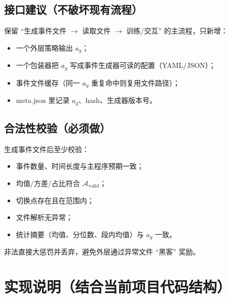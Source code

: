\documentclass[UTF8,11pt,a4paper]{ctexart}
\begin{document}
\subsection{接口建议（不破坏现有流程）}
保留 ``生成事件文件 $\to$ 读取文件 $\to$ 训练/交互'' 的主流程，只新增：
\begin{itemize}
\item 一个外层策略输出 $a_g$；
\item 一个包装器把 $a_g$ 写成事件生成器可读的配置（YAML/JSON）；
\item 事件文件缓存（同一 $a_g$ 重复命中则复用文件路径）；
\item meta.json 里记录 $a_g$、hash、生成器版本号。
\end{itemize}

\subsection{合法性校验（必须做）}
生成事件文件后至少校验：
\begin{itemize}
\item 事件数量、时间长度与主程序预期一致；
\item 均值/方差/占比符合 $\mathcal{A}_{\mathrm{valid}}$；
\item 切换点存在且在范围内；
\item 文件解析无异常；
\item 统计摘要（均值、分位数、段内均值）与 $a_g$ 一致。
\end{itemize}
非法直接大惩罚并丢弃，避免外层通过异常文件 ``黑客'' 奖励。

\section{实现说明（结合当前项目代码结构）}
\end{document}
